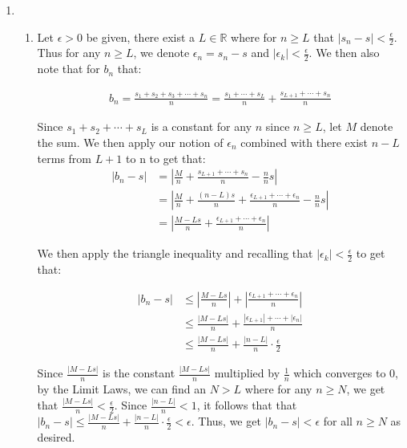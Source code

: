 \documentclass{article}
\begin{document}
\begin{enumerate}
    \item
    \begin{enumerate}[label=(\alph*)]
        \item 
        Let $\epsilon > 0$ be given, there exist a $L \in \mathbb{R}$ where for $n \geq L$ that $|s_n - s| < \frac{\epsilon}{2}$. Thus for any $n \geq L$, we denote $\epsilon_n = s_n - s$ and $|\epsilon_k| < \frac{\epsilon}{2}$. We then also note that for $b_n$ that: 

        \begin{align*}
        b_n = \frac{s_1 + s_2 + s_3 + \cdots + s_n}{n} = \frac{s_1 + \cdots + s_L}{n} + \frac{s_{L + 1} + \cdots + s_n}{n}
        \end{align*}

        Since $s_1 + s_2 + \cdots + s_L$ is a constant for any $n$ since $n \geq L$, let $M$ denote the sum. We then apply our notion of $\epsilon_n$ combined with there exist $n - L$ terms from $L + 1 $ to n to get that: 
        \begin{align*}
        |b_n - s| &= |\frac{M}{n} + \frac{s_{L + 1} + \cdots + s_n}{n} - \frac{n}{n}s|\\
        &= |\frac{M}{n} + \frac{(n-L)s}{n} + \frac{\epsilon_{L + 1} + \cdots + \epsilon_n}{n} - \frac{n}{n}s| \\
        &= |\frac{M - Ls}{n} + \frac{\epsilon_{L + 1} + \cdots + \epsilon_n}{n}|
        \end{align*}

        We then apply the triangle inequality and recalling that $|\epsilon_k| < \frac{\epsilon}{2}$ to get that: 

        \begin{align*}
        |b_n - s| &\leq |\frac{M - Ls}{n}| + |\frac{\epsilon_{L + 1} + \cdots + \epsilon_n}{n}| \\
        &\leq \frac{|M - Ls|}{n} + \frac{|\epsilon_{L + 1}| + \cdots + |\epsilon_n|}{n} \\
        &\leq  \frac{|M - Ls|}{n} + \frac{|n - L|}{n} \cdot \frac{\epsilon}{2}
        \end{align*}

        Since $\frac{|M - Ls|}{n}$ is the constant $\frac{|M - Ls|}{n}$ multiplied by $\frac{1}{n}$ which converges to 0, by the Limit Laws, we can find an $N > L$ where for any $n \geq N$, we get that $\frac{|M - Ls|}{n} < \frac{\epsilon}{2}$. Since $\frac{|n-L|}{n} < 1$, it follows that that $|b_n - s| \leq \frac{|M - Ls|}{n} + \frac{|n - L|}{n} \cdot \frac{\epsilon}{2} < \epsilon$. Thus, we get $|b_n -s | < \epsilon$ for all $n \geq N$ as desired. \\
        


\end{enumerate}
\end{enumerate}
\end{document}
